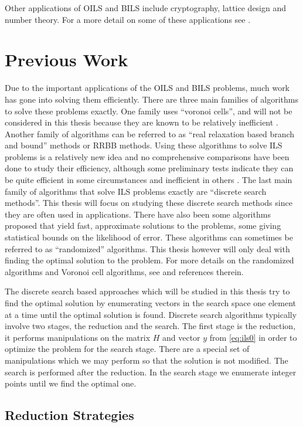 \documentclass[12pt,Bold,letterpaper]{mcgilletdclass}
\newcommand{\vsp}{\vspace{\baselineskip}}
\begin{document}
Other applications of OILS and BILS include cryptography, lattice design and number theory. For a more detail on some of these applications see \cite{HanPS11}.

\vsp \section{Previous Work} \label{sec:prevWork}
Due to the important applications of the OILS and BILS problems, much work has
gone into solving them efficiently. There are three main families of algorithms to solve these problems exactly. One family uses ``voronoi cells'', and will not be considered in this thesis because they are known to be relatively
inefficient \cite{HanPS11}. Another family of algorithms can be referred to as ``real
relaxation based branch and bound'' methods or RRBB methods. Using these algorithms to solve ILS
problems is a relatively new idea and no comprehensive comparisons have been
done to study their efficiency, although some preliminary tests indicate they
can be quite efficient in some circumstances and inefficient in others \cite{Ku11}. The last main family of algorithms
that solve ILS problems exactly are ``discrete search methods''. This thesis
will focus on studying these discrete search methods since they are often used in applications. There have also been some algorithms proposed that yield fast,
approximate solutions to the problems, some giving statistical bounds on the
likelihood of error. These algorithms can sometimes be referred to as
``randomized'' algorithms. This thesis however will only deal with finding the
optimal solution to the problem. For more details on the randomized algorithms
and Voronoi cell algorithms, see \cite{HanPS11} and references therein.

The discrete search based approaches which will be studied in this thesis try to find the optimal solution by enumerating vectors in the search space one element at a time until the optimal solution is found. Discrete search algorithms typically involve two stages, the reduction and the search. The first stage is the reduction, it performs manipulations on the matrix $H$ and vector $y$ from \eqref{eq:ils0} in order to optimize the problem for the search stage. There are a special set of manipulations which we may perform so that the solution is not modified. The search is performed after the reduction. In the search stage we enumerate integer points until we find the optimal one.

\vsp \subsection{Reduction Strategies} \label{subsec:Reductions}
\end{document}
